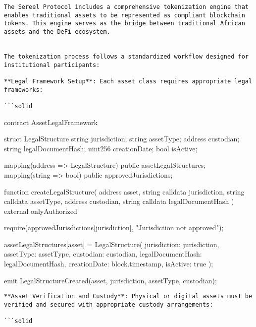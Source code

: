 \documentclass[12pt]{article}
\begin{document}
\begin{lstlisting}
The Sereel Protocol includes a comprehensive tokenization engine that enables traditional assets to be represented as compliant blockchain tokens. This engine serves as the bridge between traditional African assets and the DeFi ecosystem.


The tokenization process follows a standardized workflow designed for institutional participants:

**Legal Framework Setup**: Each asset class requires appropriate legal frameworks:

```solid
\end{lstlisting}
contract AssetLegalFramework {    struct LegalStructure {        string jurisdiction;        string assetType;        address custodian;        string legalDocumentHash;        uint256 creationDate;        bool isActive;    }

    mapping(address => LegalStructure) public assetLegalStructures;    mapping(string => bool) public approvedJurisdictions;

    function createLegalStructure(        address asset,        string calldata jurisdiction,        string calldata assetType,        address custodian,        string calldata legalDocumentHash    ) external onlyAuthorized {        require(approvedJurisdictions[jurisdiction], "Jurisdiction not approved");

        assetLegalStructures[asset] = LegalStructure({            jurisdiction: jurisdiction,            assetType: assetType,            custodian: custodian,            legalDocumentHash: legalDocumentHash,            creationDate: block.timestamp,            isActive: true        });

        emit LegalStructureCreated(asset, jurisdiction, assetType, custodian);    }}
\begin{lstlisting}
**Asset Verification and Custody**: Physical or digital assets must be verified and secured with appropriate custody arrangements:

```solid
\end{lstlisting}
\end{document}
